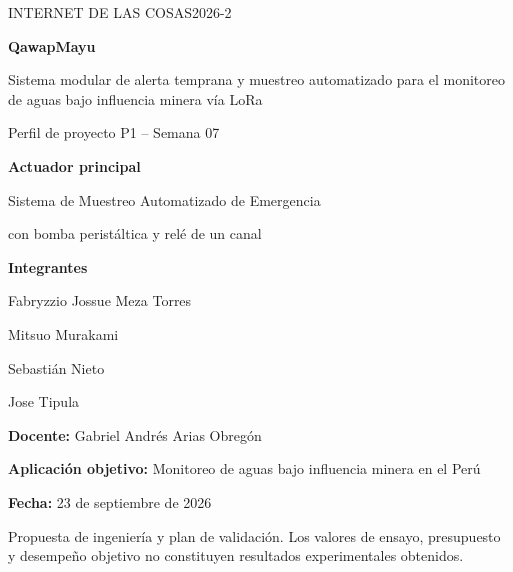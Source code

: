 \documentclass[11pt,a4paper]{article}
\begin{document}
\hypersetup{pageanchor=false}
\begin{titlepage}

\color{navy}

{\large INTERNET DE LAS COSAS\hfill 2026-2}\par

\vspace{1.8cm}

{\Huge\bfseries QawapMayu\par}

\vspace{0.5cm}

{\LARGE
Sistema modular de alerta temprana y muestreo automatizado para el monitoreo de aguas bajo influencia minera vía LoRa
\par}

\vspace{0.8cm}

{\Large Perfil de proyecto P1 -- Semana 07\par}

\vspace{0.8cm}

\colorbox{pale}{
    \parbox{0.92\textwidth}{
        \vspace{4mm}

        \textbf{Actuador principal}\par
        Sistema de Muestreo Automatizado de Emergencia\par
        con bomba peristáltica y relé de un canal

        \vspace{4mm}
    }
}

\vfill

\textbf{Integrantes}\par
Fabryzzio Jossue Meza Torres\par
Mitsuo Murakami\par
Sebastián Nieto\par
Jose Tipula\par

\vspace{0.4cm}

\textbf{Docente:} Gabriel Andrés Arias Obregón\par
\textbf{Aplicación objetivo:} Monitoreo de aguas bajo influencia minera en el Perú\par
\textbf{Fecha:} 23 de septiembre de 2026\par

\vspace{0.8cm}

{\small
Propuesta de ingeniería y plan de validación.
Los valores de ensayo, presupuesto y desempeño objetivo no constituyen resultados experimentales obtenidos.
}

\end{titlepage}
\end{document}
